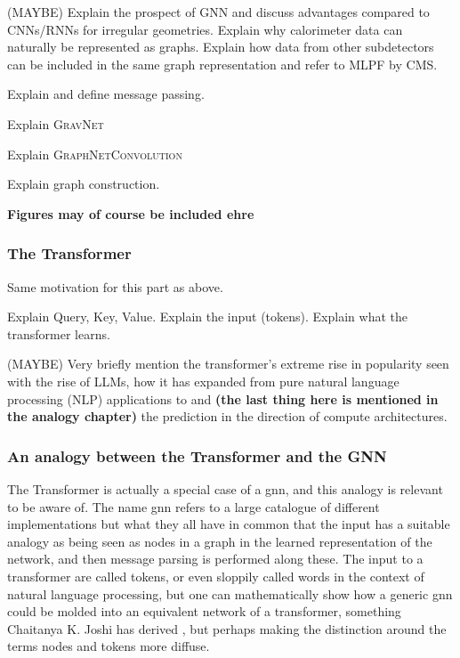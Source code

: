 (MAYBE) Explain the prospect of GNN and discuss advantages compared to CNNs/RNNs for irregular geometries. Explain why calorimeter data can naturally be represented as graphs. Explain how data from other subdetectors can be included in the same graph representation and refer to MLPF by CMS.

Explain and define message passing.

Explain \textsc{GravNet}

Explain \textsc{GraphNetConvolution} \cite{qasim2019-gravnet}


Explain graph construction.

\textbf{Figures may of course be included ehre}

\subsubsection{The Transformer}

Same motivation for this part as above. 

Explain Query, Key, Value. Explain the input (tokens). Explain what the transformer learns. 

(MAYBE) Very briefly mention the transformer's extreme rise in popularity seen with the rise of LLMs, how it has expanded from pure natural language processing (NLP) applications to and \textbf{(the last thing here is mentioned in the analogy chapter)} the prediction in the direction of compute architectures.


\subsubsection{An analogy between the Transformer and the GNN}

The Transformer is actually a special case of a \gls{gnn}, and this analogy is relevant to be aware of. The name \gls{gnn} refers to a large catalogue of different implementations but what they all have in common that the input has a suitable analogy as being seen as nodes in a graph in the learned representation of the network, and then message parsing is performed along these. The input to a transformer are called tokens, or even sloppily called words in the context of natural language processing, but one can mathematically show how a generic \gls{gnn} could be molded into an equivalent network of a transformer, something Chaitanya K. Joshi has derived \cite{joshi2025transformersgnn}, but perhaps making the distinction around the terms nodes and tokens more diffuse. 

